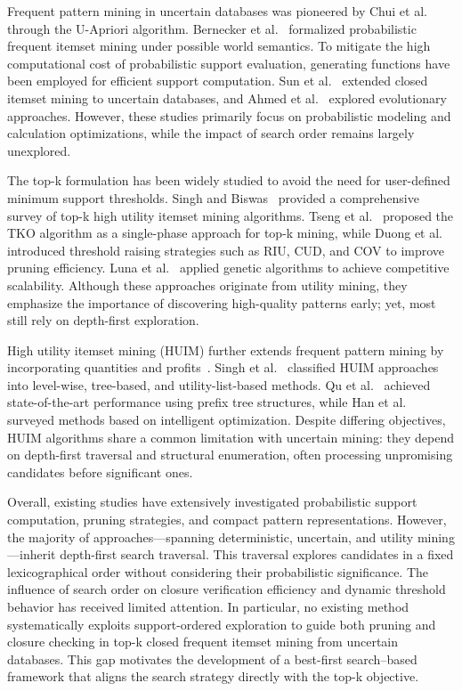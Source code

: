 \documentclass[10pt,letterpaper]{article}
\begin{document}
Frequent pattern mining in uncertain databases was pioneered by Chui et al.~\cite{bib13} through the U-Apriori algorithm. Bernecker et al.~\cite{bib3} formalized probabilistic frequent itemset mining under possible world semantics. To mitigate the high computational cost of probabilistic support evaluation, generating functions have been employed for efficient support computation. Sun et al.~\cite{bib14} extended closed itemset mining to uncertain databases, and Ahmed et al.~\cite{bib15} explored evolutionary approaches. However, these studies primarily focus on probabilistic modeling and calculation optimizations, while the impact of search order remains largely unexplored.

The top-k formulation has been widely studied to avoid the need for user-defined minimum support thresholds. Singh and Biswas~\cite{bib16} provided a comprehensive survey of top-k high utility itemset mining algorithms. Tseng et al.~\cite{bib17} proposed the TKO algorithm as a single-phase approach for top-k mining, while Duong et al.~\cite{bib18} introduced threshold raising strategies such as RIU, CUD, and COV to improve pruning efficiency. Luna et al.~\cite{bib19} applied genetic algorithms to achieve competitive scalability. Although these approaches originate from utility mining, they emphasize the importance of discovering high-quality patterns early; yet, most still rely on depth-first exploration.

High utility itemset mining (HUIM) further extends frequent pattern mining by incorporating quantities and profits~\cite{bib7}. Singh et al.~\cite{bib20} classified HUIM approaches into level-wise, tree-based, and utility-list-based methods. Qu et al.~\cite{bib21} achieved state-of-the-art performance using prefix tree structures, while Han et al.~\cite{bib22} surveyed methods based on intelligent optimization. Despite differing objectives, HUIM algorithms share a common limitation with uncertain mining: they depend on depth-first traversal and structural enumeration, often processing unpromising candidates before significant ones.

Overall, existing studies have extensively investigated probabilistic support computation, pruning strategies, and compact pattern representations. However, the majority of approaches—spanning deterministic, uncertain, and utility mining—inherit depth-first search traversal. This traversal explores candidates in a fixed lexicographical order without considering their probabilistic significance. The influence of search order on closure verification efficiency and dynamic threshold behavior has received limited attention. In particular, no existing method systematically exploits support-ordered exploration to guide both pruning and closure checking in top-k closed frequent itemset mining from uncertain databases. This gap motivates the development of a best-first search--based framework that aligns the search strategy directly with the top-k objective.
\end{document}
